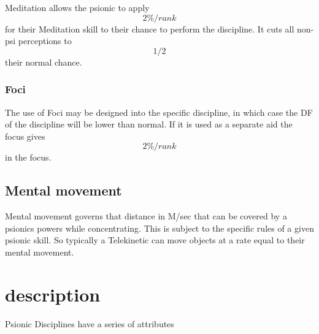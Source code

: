 \documentclass{book}
\begin{document}
Meditation allows the psionic to apply \[ 2\%/rank\] for their Meditation skill to their chance
to perform the discipline. It cuts all non-psi perceptions to  \[ 1/2\]
their normal chance.

\subsubsection{Foci}

The use of Foci may be designed into the specific discipline, in which
case the DF of the discipline will be lower than normal. If it is used
as a separate aid the focus gives \[ 2\%/rank\] in the focus. 

\subsection{Mental movement}

Mental movement governs that distance in M/sec that can be covered by 
a psionics powers while concentrating. This is subject to the specific
rules of a given psionic skill. So typically a Telekinetic can move
objects at a rate equal to their mental movement.


\section{description}

Psionic Disciplines have a series of attributes
\end{document}
